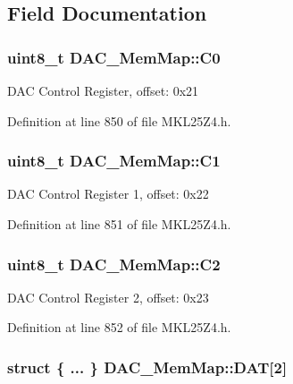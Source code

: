 \subsection{Field Documentation}
\subsubsection[{\texorpdfstring{C0}{C0}}]{\setlength{\rightskip}{0pt plus 5cm}uint8\+\_\+t D\+A\+C\+\_\+\+Mem\+Map\+::\+C0}\hypertarget{struct_d_a_c___mem_map_a101597fee641d461b61f0c02c90ef703}{}\label{struct_d_a_c___mem_map_a101597fee641d461b61f0c02c90ef703}
D\+AC Control Register, offset\+: 0x21 

Definition at line 850 of file M\+K\+L25\+Z4.\+h.

\subsubsection[{\texorpdfstring{C1}{C1}}]{\setlength{\rightskip}{0pt plus 5cm}uint8\+\_\+t D\+A\+C\+\_\+\+Mem\+Map\+::\+C1}\hypertarget{struct_d_a_c___mem_map_a29c8fe336000ac0b40c05c444be3bc1b}{}\label{struct_d_a_c___mem_map_a29c8fe336000ac0b40c05c444be3bc1b}
D\+AC Control Register 1, offset\+: 0x22 

Definition at line 851 of file M\+K\+L25\+Z4.\+h.

\subsubsection[{\texorpdfstring{C2}{C2}}]{\setlength{\rightskip}{0pt plus 5cm}uint8\+\_\+t D\+A\+C\+\_\+\+Mem\+Map\+::\+C2}\hypertarget{struct_d_a_c___mem_map_a8c2e7ea3f41f7b867578fdec48b4dacc}{}\label{struct_d_a_c___mem_map_a8c2e7ea3f41f7b867578fdec48b4dacc}
D\+AC Control Register 2, offset\+: 0x23 

Definition at line 852 of file M\+K\+L25\+Z4.\+h.

\subsubsection[{\texorpdfstring{D\+AT}{DAT}}]{\setlength{\rightskip}{0pt plus 5cm}struct \{ ... \}   D\+A\+C\+\_\+\+Mem\+Map\+::\+D\+AT\mbox{[}2\mbox{]}}\hypertarget{struct_d_a_c___mem_map_a87da01d78bace641b9002755d83af3fb}{}\label{struct_d_a_c___mem_map_a87da01d78bace641b9002755d83af3fb}
